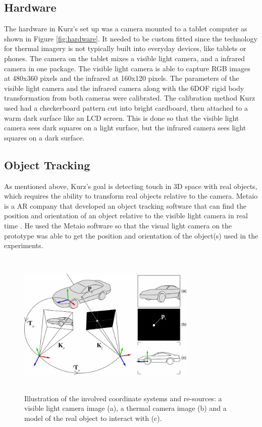 \documentclass{sig-alternate}
\begin{document}
\subsection{Hardware}
\label{Hardware}
The hardware in Kurz's \cite{Thermal} set up was a camera mounted to a tablet computer as shown in Figure \ref{fig:hardware}. It needed to be custom fitted since the technology for thermal imagery is not typically built into everyday devices, like tablets or phones. The camera on the tablet mixes a visible light camera, and a infrared camera in one package. The visible light camera is able to capture RGB images at 480x360 pixels and the infrared at 160x120 pixels. The parameters of the visible light camera and the infrared camera along with the 6DOF rigid body transformation from both cameras were calibrated. The calibration method Kurz used had a checkerboard pattern cut into bright cardboard, then attached to a warm dark surface like an LCD screen. This is done so that the visible light camera sees dark squares on a light surface, but the infrared camera sees light squares on a dark surface.


\subsection{Object Tracking}
\label{Object Tracking}
As mentioned above,  Kurz's goal is detecting touch in 3D space with real objects, which requires the ability to transform real objects relative to the camera. Metaio is a AR company that developed an object tracking software that can find the position and orientation of an object relative to the visible light camera in real time \cite{Thermal}. He used the Metaio software so that the visual light camera on the prototype was able to get the position and orientation of the object(s) used in the experiments.     

\begin{figure}
	\includegraphics[width=8.5cm, height=7cm]{Tracking}
	\caption{Illustration of the involved coordinate systems and re-sources: a visible light camera image (a), a thermal camera image (b) and a model of the real object to interact with (c).\cite{Thermal}}
	\label{fig:Tracking}
\end{figure}
\end{document}
